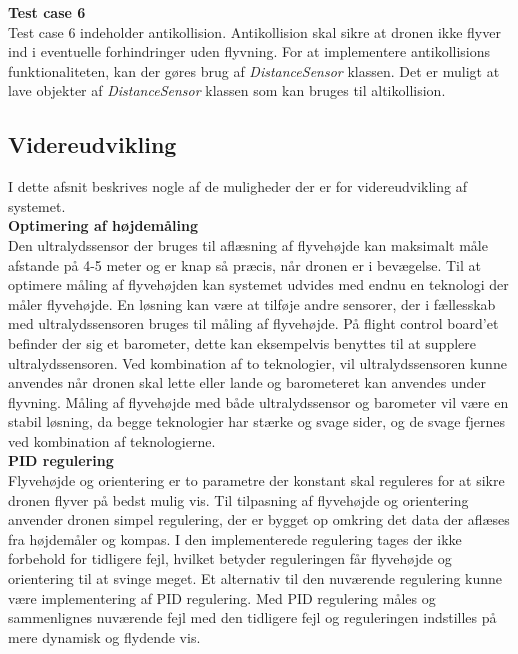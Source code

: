 \textbf{Test case 6}\\
Test case 6 indeholder antikollision. Antikollision skal sikre at dronen ikke flyver ind i eventuelle forhindringer uden flyvning. For at implementere antikollisions funktionaliteten, kan der gøres brug af \textit{DistanceSensor} klassen. Det er muligt at lave objekter af \textit{DistanceSensor} klassen som kan bruges til altikollision. 

\newpage

\subsection{Videreudvikling}

I dette afsnit beskrives nogle af de muligheder der er for videreudvikling af systemet.  \\

\textbf{Optimering af højdemåling}\\
Den ultralydssensor der bruges til aflæsning af flyvehøjde kan maksimalt måle afstande på 4-5 meter og er knap så præcis, når dronen er i bevægelse. 
Til at optimere måling af flyvehøjden kan systemet udvides med endnu en teknologi der måler flyvehøjde. En løsning kan være at tilføje andre sensorer, der i fællesskab med ultralydssensoren bruges til måling af flyvehøjde. 
På flight control board'et befinder der sig et barometer, dette kan eksempelvis benyttes til at supplere ultralydssensoren.
Ved kombination af to teknologier, vil ultralydssensoren kunne anvendes når dronen skal lette eller lande og barometeret kan anvendes under flyvning. 
Måling af flyvehøjde med både ultralydssensor og barometer vil være en stabil løsning, da begge teknologier har stærke og svage sider, og de svage fjernes ved kombination af teknologierne.\\


\textbf{PID regulering}\\
Flyvehøjde og orientering er to parametre der konstant skal reguleres for at sikre dronen flyver på bedst mulig vis. Til tilpasning af flyvehøjde og orientering anvender dronen simpel regulering, der er bygget op omkring det data der aflæses fra højdemåler og kompas.
I den implementerede regulering tages der ikke forbehold for tidligere fejl, hvilket betyder reguleringen får flyvehøjde og orientering til at svinge meget. 
Et alternativ til den nuværende regulering kunne være implementering af PID regulering. Med PID regulering måles og sammenlignes nuværende fejl med den tidligere fejl og reguleringen indstilles på mere dynamisk og flydende vis. \\


